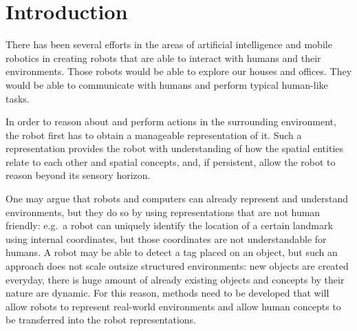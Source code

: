 \chapter{Introduction}

%

There has been several efforts in the areas of artificial intelligence and mobile robotics
in creating robots that are able to interact with humans and their environments.
Those robots would be able to explore our houses and offices. They would be able to communicate
with humans and perform typical human-like tasks.



In order to reason about and perform actions in the surrounding environment, the robot first 
has to obtain a manageable representation of it. Such a representation provides the robot with 
understanding of how the spatial entities relate to each other and spatial concepts, and, 
if persistent, allow the robot to reason beyond its sensory horizon.

One may argue that robots and computers can already represent and understand environments, but they
do so by using representations that are not human friendly: e.g.\ a robot can uniquely identify the
location of a certain landmark using internal coordinates, but those coordinates are not understandable
for humans. A robot may be able to detect a tag placed on an object, but such an approach does not scale
outsize structured environments: new objects are created everyday, there is huge amount of already
existing objects and concepts by their nature are dynamic. For this reason, methods need 
to be developed that will allow robots to represent real-world environments and allow human concepts
to be transferred into the robot representations.


